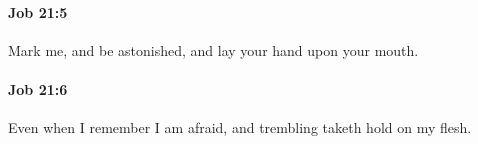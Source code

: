 		\paragraph{Job 21:5} %
			\label{JOB-21-5}

			Mark me, and be astonished, and lay your hand upon your mouth.


		\paragraph{Job 21:6} %
			\label{JOB-21-6}

			Even when I remember I am afraid, and trembling taketh hold on my flesh.


